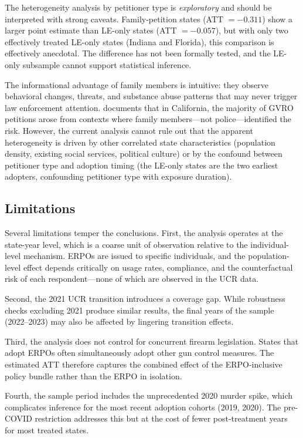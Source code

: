 \documentclass[12pt]{article}
\begin{document}
The heterogeneity analysis by petitioner type is \textit{exploratory} and should be interpreted with strong caveats. Family-petition states (ATT $= -0.311$) show a larger point estimate than LE-only states (ATT $= -0.057$), but with only two effectively treated LE-only states (Indiana and Florida), this comparison is effectively anecdotal. The difference has not been formally tested, and the LE-only subsample cannot support statistical inference.

The informational advantage of family members is intuitive: they observe behavioral changes, threats, and substance abuse patterns that may never trigger law enforcement attention. \citet{wintemute2019extreme} documents that in California, the majority of GVRO petitions arose from contexts where family members---not police---identified the risk. However, the current analysis cannot rule out that the apparent heterogeneity is driven by other correlated state characteristics (population density, existing social services, political culture) or by the confound between petitioner type and adoption timing (the LE-only states are the two earliest adopters, confounding petitioner type with exposure duration).

\subsection{Limitations}

Several limitations temper the conclusions. First, the analysis operates at the state-year level, which is a coarse unit of observation relative to the individual-level mechanism. ERPOs are issued to specific individuals, and the population-level effect depends critically on usage rates, compliance, and the counterfactual risk of each respondent---none of which are observed in the UCR data.

Second, the 2021 UCR transition introduces a coverage gap. While robustness checks excluding 2021 produce similar results, the final years of the sample (2022--2023) may also be affected by lingering transition effects.

Third, the analysis does not control for concurrent firearm legislation. States that adopt ERPOs often simultaneously adopt other gun control measures. The estimated ATT therefore captures the combined effect of the ERPO-inclusive policy bundle rather than the ERPO in isolation.

Fourth, the sample period includes the unprecedented 2020 murder spike, which complicates inference for the most recent adoption cohorts (2019, 2020). The pre-COVID restriction addresses this but at the cost of fewer post-treatment years for most treated states.
\end{document}
